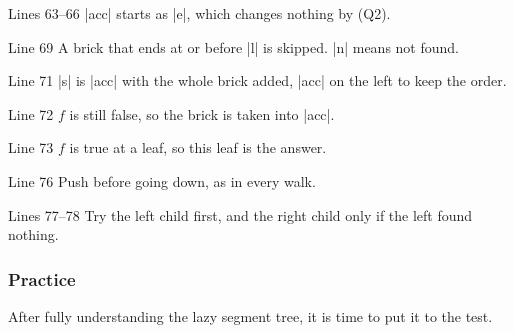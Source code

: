 
\begin{notes}
\begin{lines}
\item[Lines 63--66] \code|acc| starts as \code|e|, which changes nothing by \textup{(Q2)}.
\item[Line 69] A brick that ends at or before \code|l| is skipped. \code|n| means not found.
\item[Line 71] \code|s| is \code|acc| with the whole brick added, \code|acc| on the left to keep the order.
\item[Line 72] \(f\) is still false, so the brick is taken into \code|acc|.
\item[Line 73] \(f\) is true at a leaf, so this leaf is the answer.
\item[Line 76] Push before going down, as in every walk.
\item[Lines 77--78] Try the left child first, and the right child only if the left found nothing.
\end{lines}
\end{notes}

\subsubsection{Practice}
After fully understanding the lazy segment tree, it is time to put it to the test.

